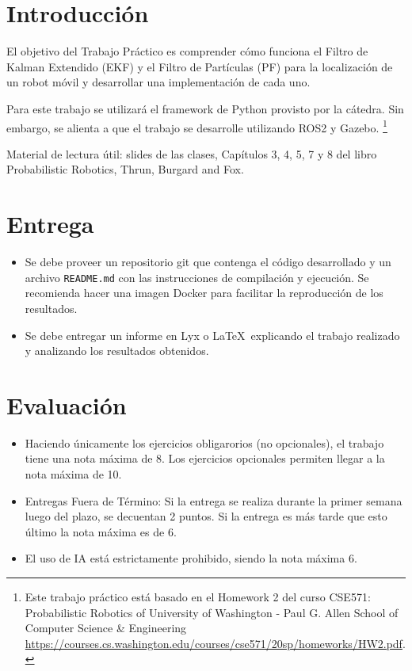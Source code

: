 \documentclass[tp]{lcc}
\begin{document}
	\maketitle
	
	
	\section{Introducción}
	
	El objetivo del Trabajo Práctico es comprender cómo funciona el Filtro de Kalman Extendido (EKF) y el Filtro de Partículas (PF) para la localización de un robot móvil y desarrollar una implementación de cada uno.
	
	Para este trabajo se utilizará el framework de Python provisto por la cátedra. Sin embargo, se alienta a que el trabajo se desarrolle utilizando ROS2 y Gazebo. \footnote{Este trabajo práctico está basado en el Homework 2 del curso CSE571: Probabilistic Robotics of University of Washington - Paul G. Allen School of Computer Science \& Engineering \url{https://courses.cs.washington.edu/courses/cse571/20sp/homeworks/HW2.pdf}.}
	
	Material de lectura útil: slides de las clases, Capítulos 3, 4, 5, 7 y 8 del libro Probabilistic Robotics, Thrun, Burgard and Fox.
	
	
	\section{Entrega}
	\begin{itemize}
		\item Se debe proveer un repositorio git que contenga el código desarrollado y un archivo \lstinline{README.md} con las instrucciones de compilación y ejecución. Se recomienda hacer una imagen Docker para facilitar la reproducción de los resultados.

		\item Se debe entregar un informe en Lyx o \LaTeX\  explicando el trabajo realizado y analizando los resultados obtenidos.
	\end{itemize}

	\section{Evaluación}
	\begin{itemize}
		\item Haciendo únicamente los ejercicios obligarorios (no opcionales), el trabajo tiene una nota máxima de 8. Los ejercicios opcionales permiten llegar a la nota máxima de 10.

		\item Entregas Fuera de Término: Si la entrega se realiza durante la primer semana luego del plazo, se decuentan 2 puntos. Si la entrega es más tarde que esto último la nota máxima es de 6.
		
		\item El uso de IA está estrictamente prohibido, siendo la nota máxima 6.
	\end{itemize}
\end{document}
